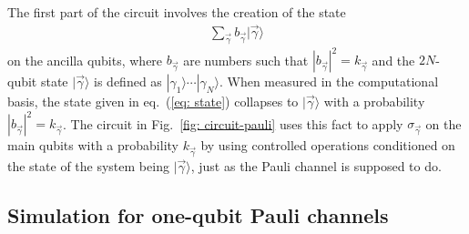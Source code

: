 \documentclass[10pt,letterpaper]{article} %
\newcommand{\fref}[1]{Fig.~\ref{#1}}
\newcommand{\eref}[1]{eq.~(\ref{#1})}
\begin{document}
The first part of the circuit involves the creation of the state
\begin{eqnarray}
\label{eq: state}
\sum_{\vec{\gamma}} b_{\vec{\gamma}} |\vec{\gamma} \rangle
\end{eqnarray}
on the ancilla qubits, where $b_{\vec{\gamma}}$ are numbers such that $
|b_{\vec{\gamma}}|^2 = k_{\vec{\gamma}}$ and
the $2N$-qubit state $|\vec{\gamma}\rangle$ is defined as $|\gamma_1\rangle
\cdots |\gamma_N\rangle$.
When measured in the computational basis, the state given in \eref{eq: state}
collapses to $|\vec{\gamma}\rangle$ with a 
probability $|b_{\vec{\gamma}}|^2 = k_{\vec\gamma}$. 
The circuit in \fref{fig: circuit-pauli} uses this fact
to apply $\sigma_{\vec{\gamma}}$ on the main qubits
with a probability $k_{\vec\gamma}$ by using controlled operations 
conditioned on the state of the system being $|\vec{\gamma}\rangle$,
just as the Pauli channel is supposed to do.  
% 
% 

 


\subsection{Simulation for one-qubit Pauli channels} %
\label{subsec: Simulation for one-qubit Pauli channels}
\end{document}
